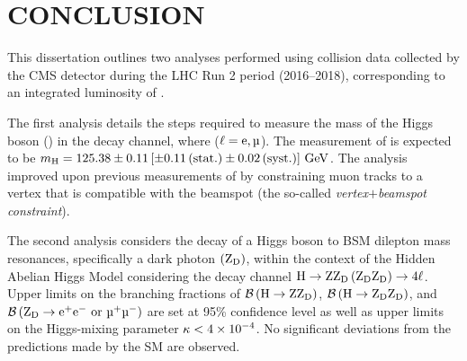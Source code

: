 \chapter{CONCLUSION}
\label{ch:conclusion}
This dissertation outlines two analyses performed using \pp collision data collected by the CMS detector during the LHC Run 2 period (2016--2018), corresponding to an integrated luminosity of \lumiruntwo.

The first analysis details the steps required to measure the mass of the Higgs boson (\mH) in the \hzzfourl decay channel, where ($\ell = \Pe, \Pmu$).
The measurement of \mH is expected to be $m_{\mathrm{H}} = 125.38 \pm 0.11 \left[\pm 0.11 \,\text{(stat.)} \pm 0.02\,\text{(syst.)} \right]\,\text{Ge\hspace{-.08em}V}$.  %
The analysis improved upon previous measurements of \mH by constraining muon tracks to a vertex that is compatible with the beamspot (the so-called \emph{vertex$+$beamspot constraint}).

The second analysis considers the decay of a Higgs boson to BSM dilepton mass resonances, specifically a dark photon $\left( \mathrm{Z}_\text{D} \right)$, within the context of the Hidden Abelian Higgs Model considering the decay channel $\mathrm{H} \to \text{Z} \mathrm{Z}_\text{D} \left( \mathrm{Z}_\text{D} \mathrm{Z}_\text{D} \right) \to 4\ell$.
Upper limits on the branching fractions of $\mathcal{B} \left( \mathrm{H} \to \text{Z} \mathrm{Z}_\text{D} \right)$, $\mathcal{B} \left( \mathrm{H} \to \mathrm{Z}_\text{D} \mathrm{Z}_\text{D} \right)$, and $\brof{\zdtoeepmormumupm}$ are set at 95\% confidence level as well as upper limits on the Higgs-mixing parameter $\kappa < 4 \times \text{10}^\text{$-$4}$.
No significant deviations from the predictions made by the SM are observed.